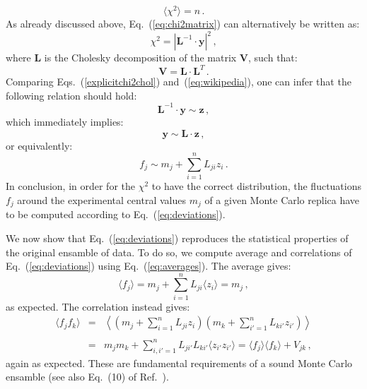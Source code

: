 \documentclass[10pt,a4paper]{article}
\begin{document}
\begin{equation}
\langle\chi^2\rangle=n\,.
\end{equation}
As already discussed above, Eq.~(\ref{eq:chi2matrix}) can
alternatively be written as:
\begin{equation}\label{explicitchi2chol}
\chi^2 = \left|\mathbf{L}^{-1}\cdot \mathbf{y}\right|^2\,,
\end{equation}
where $\mathbf{L}$ is the Cholesky decomposition of the matrix
$\mathbf{V}$, such that:
\begin{equation}\label{eq:choleskydecagain}
\mathbf{V} = \mathbf{L}\cdot\mathbf{L}^{T}\,.
\end{equation}
Comparing Eqs.~(\ref{explicitchi2chol}) and~(\ref{eq:wikipedia}), one
can infer that the following relation should hold:
\begin{equation}
\mathbf{L}^{-1}\cdot \mathbf{y}\sim\mathbf{z}\,,
\end{equation}
which immediately implies:
\begin{equation}
\mathbf{y}\sim\mathbf{L}\cdot\mathbf{z}\,,
\end{equation}
or equivalently:
\begin{equation}\label{eq:deviations}
f_j\sim m_j+\sum_{i=1}^nL_{ji}z_i\,.
\end{equation}
In conclusion, in order for the $\chi^2$ to have the correct
distribution, the fluctuations $f_j$ around the experimental central
values $m_j$ of a given Monte Carlo replica have to be computed
according to Eq.~(\ref{eq:deviations}).

We now show that Eq.~(\ref{eq:deviations}) reproduces the statistical
properties of the original ensamble of data. To do so, we compute
average and correlations of Eq.~(\ref{eq:deviations}) using
Eq.~(\ref{eq:averages}). The average gives:
\begin{equation}
\langle f_j\rangle = m_j+\sum_{i=1}^nL_{ji}\langle z_i \rangle = m_j\,,
\end{equation}
as expected. The correlation instead gives:
\begin{equation}
\begin{array}{rcl}
\langle f_j f_k\rangle &=& \displaystyle \left\langle
  \left(m_j+\sum_{i=1}^nL_{ji}z_i\right)
  \left(m_k+\sum_{i'=1}^nL_{ki'}z_{i'}\right)\right\rangle\\
\\
&=& \displaystyle m_jm_k+\sum_{i,i'=1}^nL_{ji'}L_{ki'}\langle z_{i'}
    z_{i'}\rangle=\langle f_j \rangle\langle f_k\rangle+V_{jk}\,,
\end{array}
\end{equation}
again as expected. These are fundamental requirements of a sound Monte
Carlo ensamble (see also Eq.~(10) of Ref.~\cite{Ball:2009qv}).
\end{document}
